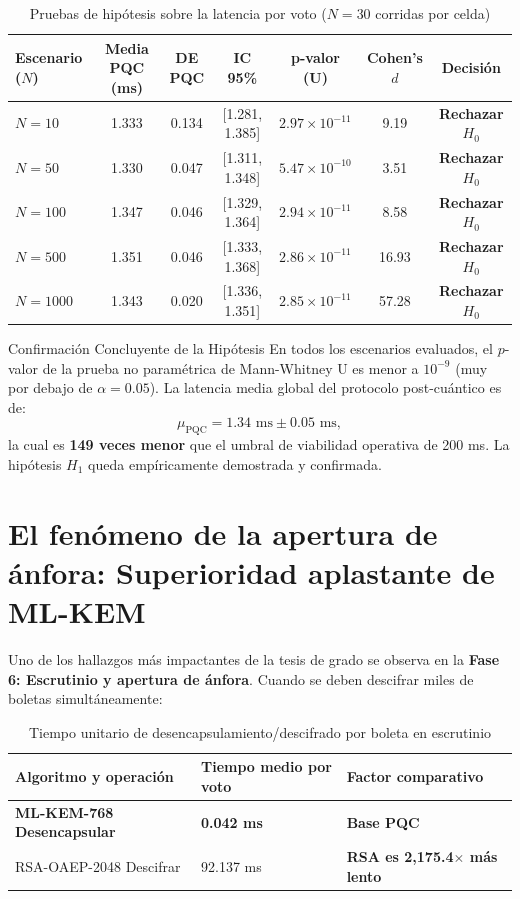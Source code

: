 \documentclass[11pt,a4paper,twoside,openright]{book}
\theoremstyle{plain}
\theoremstyle{definition}
\theoremstyle{remark}
\begin{document}
\begin{table}[H]
\centering
\caption{Pruebas de hip\'otesis sobre la latencia por voto ($N=30$ corridas por celda)}
\label{tab:latencia_hipotesis}
\begin{tabular}{lcccccc}
\toprule
\textbf{Escenario ($N$)} & \textbf{Media PQC (ms)} & \textbf{DE PQC} & \textbf{IC 95\%} & \textbf{p-valor (U)} & \textbf{Cohen's $d$} & \textbf{Decisi\'on} \\
\midrule
$N = 10$ & 1.333 & 0.134 & [1.281, 1.385] & $2.97 \times 10^{-11}$ & 9.19 & \textbf{Rechazar $H_0$} \\
$N = 50$ & 1.330 & 0.047 & [1.311, 1.348] & $5.47 \times 10^{-10}$ & 3.51 & \textbf{Rechazar $H_0$} \\
$N = 100$ & 1.347 & 0.046 & [1.329, 1.364] & $2.94 \times 10^{-11}$ & 8.58 & \textbf{Rechazar $H_0$} \\
$N = 500$ & 1.351 & 0.046 & [1.333, 1.368] & $2.86 \times 10^{-11}$ & 16.93 & \textbf{Rechazar $H_0$} \\
$N = 1000$ & 1.343 & 0.020 & [1.336, 1.351] & $2.85 \times 10^{-11}$ & 57.28 & \textbf{Rechazar $H_0$} \\
\bottomrule
\end{tabular}
\end{table}

\begin{miteo}{Confirmaci\'on Concluyente de la Hip\'otesis}
En todos los escenarios evaluados, el $p$-valor de la prueba no param\'etrica de Mann-Whitney U es menor a $10^{-9}$ (muy por debajo de $\alpha = 0.05$). La latencia media global del protocolo post-cu\'antico es de:
\[
  \mu_{\text{PQC}} = 1.34 \text{ ms} \pm 0.05 \text{ ms},
\]
la cual es \textbf{149 veces menor} que el umbral de viabilidad operativa de 200 ms. La hip\'otesis $H_1$ queda emp\'iricamente demostrada y confirmada.
\end{miteo}

\section{El fen\'omeno de la apertura de \'anfora: Superioridad aplastante de ML-KEM}

Uno de los hallazgos m\'as impactantes de la tesis de grado se observa en la \textbf{Fase 6: Escrutinio y apertura de \'anfora}. Cuando se deben descifrar miles de boletas simult\'aneamente:

\begin{table}[H]
\centering
\caption{Tiempo unitario de desencapsulamiento/descifrado por boleta en escrutinio}
\label{tab:anfora_tally}
\begin{tabular}{lll}
\toprule
\textbf{Algoritmo y operaci\'on} & \textbf{Tiempo medio por voto} & \textbf{Factor comparativo} \\
\midrule
\textbf{ML-KEM-768 Desencapsular} & \textbf{0.042 ms} & \textbf{Base PQC} \\
RSA-OAEP-2048 Descifrar & 92.137 ms & \textbf{RSA es 2,175.4$\times$ m\'as lento} \\
\bottomrule
\end{tabular}
\end{table}
\end{document}

